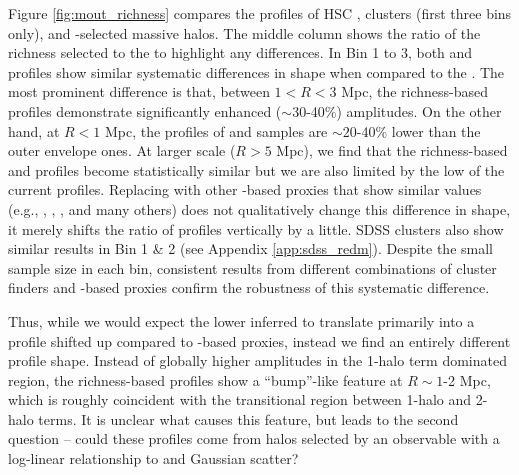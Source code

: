 \documentclass[fleqn,usenatbib,useAMS,english]{mnras}
\begin{document}
    Figure \ref{fig:mout_richness} compares the \dsigma{} profiles of HSC \redm{}, \camira{} clusters
    (first three bins only), and -selected massive halos.
    The middle column shows the ratio of the richness selected \dsigma{} to the 
    to highlight any differences.
    In Bin 1 to 3, both \redm{} and \camira{} \dsigma{} profiles show similar
    systematic differences in shape when compared to the .
    The most prominent difference is that, between $1 < R < 3$ Mpc, the richness-based \dsigma{}
    profiles demonstrate significantly enhanced ($\sim 30$-40\%) \dsigma{} amplitudes.
    On the other hand, at $R < 1$ Mpc, the \dsigma{} profiles of \redm{} and \camira{} samples
    are $\sim 20$-40\% lower than the outer envelope \mstar{} ones.
    At larger scale ($R > 5$ Mpc), we find that the richness-based and  \dsigma{}
    profiles become statistically similar but we are also limited by the low \snratio{} of the
    current profiles.
    Replacing  with other \mstar{}-based proxies that show similar \sigmvir{}
    values (e.g., , \masap{}, , and many others) does not
    qualitatively change this difference in shape, it merely shifts the ratio of \dsigma{} profiles
    vertically by a little.
    SDSS \redm{} clusters also show similar results in Bin 1 \& 2 (see Appendix
    \ref{app:sdss_redm}).
    Despite the small sample size in each bin, consistent results from different combinations
    of cluster finders and \mstar{}-based proxies confirm the robustness of this systematic
    difference.

    Thus, while we would expect the lower inferred \sigmvir{} to translate primarily into a
    profile shifted up compared to \mstar{}-based proxies, instead we find an entirely different
    profile shape.
    Instead of globally higher amplitudes in the 1-halo term dominated region, the
    richness-based \dsigma{} profiles show a ``bump''-like feature at $R \sim 1$-2 Mpc,
    which is roughly coincident with the transitional region between 1-halo and 2-halo terms.
    It is unclear what causes this feature, but leads to the second question -- could these profiles
    come from halos selected by an observable with a log-linear relationship to \mvir{} and
    Gaussian scatter?

\end{document}
